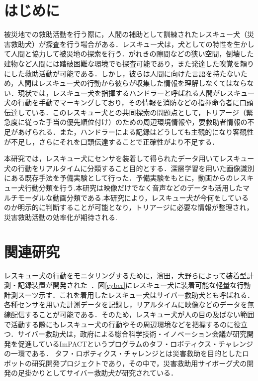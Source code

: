 \section{はじめに}
被災地での救助活動を行う際に，人間の補助として訓練されたレスキュー犬（災害救助犬）が探査を行う場合がある．レスキュー犬は，犬としての特性を生かして人間と協力して被災地の探索を行う．がれきの隙間などの狭い空間，倒壊した建物など人間には踏破困難な環境でも探査可能であり，また発達した嗅覚を頼りにした救助活動が可能である．しかし，彼らは人間に向けた言語を持たないため，人間はレスキュー犬の行動から彼らが収集した情報を理解しなくてはならない．現状では，レスキュー犬を指揮するハンドラーと呼ばれる人間がレスキュー犬の行動を手動でマーキングしており，その情報を消防などの指揮命令者に口頭伝達している．このレスキュー犬との共同探索の問題点として，トリアージ（緊急度に従った手当の優先順位付け）のための周辺環境情報や，要救助者情報の不足があげられる．また，ハンドラーによる記録はどうしても主観的になり客観性が不足し，さらにそれを口頭伝達することで正確性がより不足する．

本研究では，レスキュー犬にセンサを装着して得られたデータ用いてレスキュー犬の行動をリアルタイムに分類すること目的とする．深層学習を用いた画像識別にある既存手法を予備実験として行った．予備実験をもとに，動画からのレスキュー犬行動分類を行う.本研究は映像だけでなく音声などのデータも活用したマルチモーダルな動画分類である.本研究により，レスキュー犬が今何をしているのか明示的に判断することが可能となり，トリアージに必要な情報が整理され，災害救助活動の効率化が期待される.

\section{関連研究}

レスキュー犬の行動をモニタリングするために，濱田，大野らによって装着型計測・記録装置が開発された~\cite{dog01}．図\ref{cyber}にレスキュー犬に装着可能な軽量な行動計測スーツ示す．これを着用したレスキュー犬はサイバー救助犬とも呼ばれる．各種センサを用いた計測データを記録し，リアルタイムに映像などのデータを無線配信することが可能である．そのため，レスキュー犬が人の目の及ばない範囲で活動する際にもレスキュー犬の行動やその周辺環境などを把握するのに役立つ．サイバー救助犬は，政府による総合科学技術・イノベーション会議が研究開発を促進しているImPACTというプログラムのタフ・ロボティクス・チャレンジの一環である．
タフ・ロボティクス・チャレンジとは災害救助を目的としたロボットの研究開発プロジェクトであり，その中で，災害救助用サイボーグ犬の開発の足掛かりとしてサイバー救助犬が研究されている．

